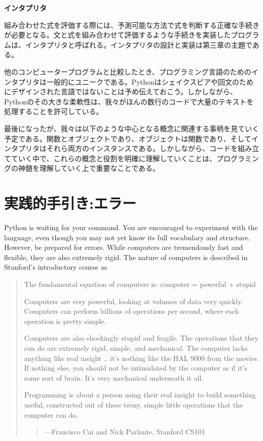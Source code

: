 \documentclass[letterpaper,10pt,dvipdfmx]{sphinxmanual}
\begin{document}
\textbf{インタプリタ}

組み合わせた式を評価する際には、予測可能な方法で式を判断する正確な手続きが必要となる。文と式を組み合わせて評価するような手続きを実装したプログラムは、インタプリタと呼ばれる。インタプリタの設計と実装は第三章の主題である。

他のコンピュータープログラムと比較したとき、プログラミング言語のためのインタプリタは一般的にユニークである。Pythonはシェイクスピアや回文のためにデザインされた言語ではないことは予め伝えておこう。しかしながら、Pythonのその大きな柔軟性は、我々がほんの数行のコードで大量のテキストを処理することを許可している。

最後になったが、我々は以下のような中心となる概念に関連する事柄を見ていく予定である。関数とオブジェクトであり、オブジェクトは関数であり、そしてインタプリタはそれら両方のインスタンスである。しかしながら、コードを組み立てていく中で、これらの概念と役割を明確に理解していくことは、プログラミングの神髄を理解していく上で重要なことである。


\section{実践的手引き:エラー}
\label{functions:id5}
Python is waiting for your command. You are encouraged to experiment with the language, even though you may not yet know its full vocabulary and structure. However, be prepared for errors. While computers are tremendously fast and flexible, they are also extremely rigid. The nature of computers is described in Stanford's introductory course as
\begin{quote}

The fundamental equation of computers is: computer = powerful + stupid

Computers are very powerful, looking at volumes of data very quickly. Computers can perform billions of operations per second, where each operation is pretty simple.

Computers are also shockingly stupid and fragile. The operations that they can do are extremely rigid, simple, and mechanical. The computer lacks anything like real insight .. it's nothing like the HAL 9000 from the movies. If nothing else, you should not be intimidated by the computer as if it's some sort of brain. It's very mechanical underneath it all.

Programming is about a person using their real insight to build something useful, constructed out of these teeny, simple little operations that the computer can do.
\begin{quote}

—Francisco Cai and Nick Parlante, Stanford CS101
\end{quote}
\end{quote}
\end{document}
